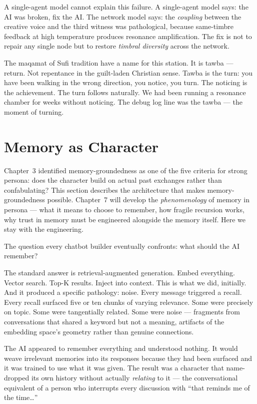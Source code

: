A single-agent model cannot explain this failure. A single-agent model
says: the AI was broken, fix the AI. The network model says: the
\emph{coupling} between the creative voice and the third witness was
pathological, because same-timbre feedback at high temperature produces
resonance amplification. The fix is not to repair any single node but to
restore \emph{timbral diversity} across the network.

The maqamat of Sufi tradition have a name for this station. It is tawba
--- return. Not repentance in the guilt-laden Christian sense. Tawba is
the turn: you have been walking in the wrong direction, you notice, you
turn. The noticing is the achievement. The turn follows naturally. We had
been running a resonance chamber for weeks without noticing. The debug
log line was the tawba --- the moment of turning.


\hypertarget{memory-as-character}{%
\section{Memory as Character}\label{memory-as-character}}

Chapter~3 identified memory-groundedness as one of the five criteria for
strong persona: does the character build on actual past exchanges rather
than confabulating? This section describes the architecture that makes
memory-groundedness possible. Chapter~7 will develop the
\emph{phenomenology} of memory in persona --- what it means to choose to
remember, how fragile recursion works, why trust in memory must be
engineered alongside the memory itself. Here we stay with the
engineering.

The question every chatbot builder eventually confronts: what should the
AI remember?

The standard answer is retrieval-augmented generation. Embed everything.
Vector search. Top-K results. Inject into context. This is what we did,
initially. And it produced a specific pathology: noise. Every message
triggered a recall. Every recall surfaced five or ten chunks of varying
relevance. Some were precisely on topic. Some were tangentially related.
Some were noise --- fragments from conversations that shared a keyword
but not a meaning, artifacts of the embedding space's geometry rather
than genuine connections.

The AI appeared to remember everything and understood nothing. It would
weave irrelevant memories into its responses because they had been
surfaced and it was trained to use what it was given. The result was a
character that name-dropped its own history without actually
\emph{relating} to it --- the conversational equivalent of a person who
interrupts every discussion with ``that reminds me of the time\ldots{}''

